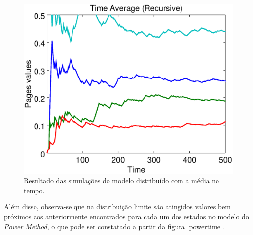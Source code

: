 \
\begin{figure}[!htb]
	\centering
	\includegraphics[scale=0.4]{imagens/timerecursive}
	\caption{Resultado das simulações do modelo distribuído com a média no tempo.}
	\label{timerecursive}
\end{figure}

Além disso, observa-se que na distribuição limite são atingidos valores bem próximos aos anteriormente encontrados para cada um dos estados no modelo do \textit{Power Method}, o que pode ser constatado a partir da figura \ref{powertime}.


